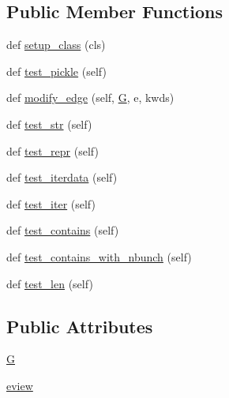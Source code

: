 \subsection*{Public Member Functions}
\begin{DoxyCompactItemize}
\item 
def \hyperlink{classnetworkx_1_1classes_1_1tests_1_1test__reportviews_1_1TestEdgeDataView_a38fe876dcefaf2d4c056b290e048aafa}{setup\+\_\+class} (cls)
\item 
def \hyperlink{classnetworkx_1_1classes_1_1tests_1_1test__reportviews_1_1TestEdgeDataView_aaa5bbd69c9d465c9f47985917eb0b3f2}{test\+\_\+pickle} (self)
\item 
def \hyperlink{classnetworkx_1_1classes_1_1tests_1_1test__reportviews_1_1TestEdgeDataView_a33a9c3acc796a17ff7b29efb5061aff9}{modify\+\_\+edge} (self, \hyperlink{classnetworkx_1_1classes_1_1tests_1_1test__reportviews_1_1TestEdgeDataView_adb147905c04105d9aa4975b1be4ebbaf}{G}, e, kwds)
\item 
def \hyperlink{classnetworkx_1_1classes_1_1tests_1_1test__reportviews_1_1TestEdgeDataView_a2ef92c562935289ab225e11fef914e63}{test\+\_\+str} (self)
\item 
def \hyperlink{classnetworkx_1_1classes_1_1tests_1_1test__reportviews_1_1TestEdgeDataView_a3dc0a57b3b537edc87cc01389c28fae1}{test\+\_\+repr} (self)
\item 
def \hyperlink{classnetworkx_1_1classes_1_1tests_1_1test__reportviews_1_1TestEdgeDataView_afa9e8dfa6e2e6fd649f14621a5055939}{test\+\_\+iterdata} (self)
\item 
def \hyperlink{classnetworkx_1_1classes_1_1tests_1_1test__reportviews_1_1TestEdgeDataView_ae6a6595c70e9b901da692671a48c50bf}{test\+\_\+iter} (self)
\item 
def \hyperlink{classnetworkx_1_1classes_1_1tests_1_1test__reportviews_1_1TestEdgeDataView_a6b83e2cd3acda2736c343ca12519f23d}{test\+\_\+contains} (self)
\item 
def \hyperlink{classnetworkx_1_1classes_1_1tests_1_1test__reportviews_1_1TestEdgeDataView_a3368be657fe1ac0d2b1218133a34aced}{test\+\_\+contains\+\_\+with\+\_\+nbunch} (self)
\item 
def \hyperlink{classnetworkx_1_1classes_1_1tests_1_1test__reportviews_1_1TestEdgeDataView_a4f9b43c7127085c7e5c8f1137adc92e3}{test\+\_\+len} (self)
\end{DoxyCompactItemize}
\subsection*{Public Attributes}
\begin{DoxyCompactItemize}
\item 
\hyperlink{classnetworkx_1_1classes_1_1tests_1_1test__reportviews_1_1TestEdgeDataView_adb147905c04105d9aa4975b1be4ebbaf}{G}
\item 
\hyperlink{classnetworkx_1_1classes_1_1tests_1_1test__reportviews_1_1TestEdgeDataView_a4c60b6489bac85377ffe27af3f9d3dac}{eview}
\end{DoxyCompactItemize}


